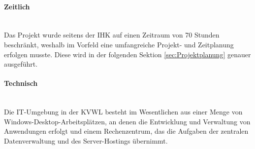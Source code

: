 \paragraph{Zeitlich}~\\\label{p:Randbedingungen:Zeitlich}
Das Projekt wurde seitens der IHK auf einen Zeitraum von 70 Stunden beschränkt, weshalb im Vorfeld eine umfangreiche Projekt- und Zeitplanung erfolgen musste. Diese wird in der folgenden Sektion \ref{sec:Projektplanung} genauer ausgeführt.

\paragraph{Technisch}~\\\label{p:Randbedingungen:Technisch}
Die IT-Umgebung in der \ac{KVWL} besteht im Wesentlichen aus einer Menge von Windows-Desktop-Arbeitsplätzen, an denen die Entwicklung und Verwaltung von Anwendungen erfolgt und einem Rechenzentrum, das die Aufgaben der zentralen Datenverwaltung und des Server-Hostings übernimmt.